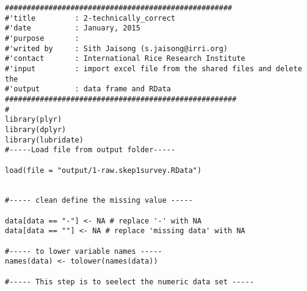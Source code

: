 \documentclass[idxtotoc,hyperref,openany]{labbook} %
\begin{document}
\begin{lstlisting}
####################################################
#'title         : 2-technically_correct
#'date          : January, 2015
#'purpose       :  
#'writed by     : Sith Jaisong (s.jaisong@irri.org)
#'contact       : International Rice Research Institute
#'input         : import excel file from the shared files and delete the 
#'output        : data frame and RData 
#####################################################
# 
library(plyr)
library(dplyr)
library(lubridate)
#-----Load file from output folder-----

load(file = "output/1-raw.skep1survey.RData")


#----- clean define the missing value -----

data[data == "-"] <- NA # replace '-' with NA
data[data == ""] <- NA # replace 'missing data' with NA

#----- to lower variable names ----- 
names(data) <- tolower(names(data))

#----- This step is to seelect the numeric data set -----


\end{lstlisting}
\end{document}
